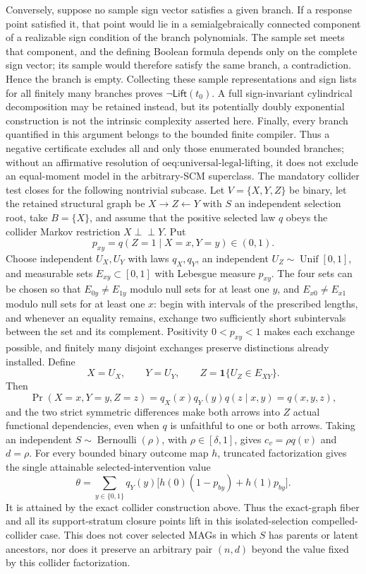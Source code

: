 Conversely, suppose no sample sign vector satisfies a given branch.  If a response point satisfied it, that point would lie in a semialgebraically connected component of a realizable sign condition of the branch polynomials.  The sample set meets that component, and the defining Boolean formula depends only on the complete sign vector; its sample would therefore satisfy the same branch, a contradiction.  Hence the branch is empty.  Collecting these sample representations and sign lists for all finitely many branches proves \(\neg\mathsf{Lift}(t_0)\).  A full sign-invariant cylindrical decomposition may be retained instead, but its potentially doubly exponential construction is not the intrinsic complexity asserted here.  Finally, every branch quantified in this argument belongs to the bounded finite compiler.  Thus a negative certificate excludes all and only those enumerated bounded branches; without an affirmative resolution of \(\text{oeq:universal-legal-lifting}\), it does not exclude an equal-moment model in the arbitrary-SCM superclass.
The mandatory collider test closes for the following nontrivial subcase.  Let \(V=\{X,Y,Z\}\) be binary, let the retained structural graph be \(X\to Z\leftarrow Y\) with \(S\) an independent selection root, take \(B=\{X\}\), and assume that the positive selected law \(q\) obeys the collider Markov restriction \(X\mathbin{\perp\!\!\!\perp}Y\).  Put
\[
p_{xy}=q(Z=1\mid X=x,Y=y)\in(0,1).
\]
Choose independent \(U_X,U_Y\) with laws \(q_X,q_Y\), an independent \(U_Z\sim\operatorname{Unif}[0,1]\), and measurable sets \(E_{xy}\subset[0,1]\) with Lebesgue measure \(p_{xy}\).  The four sets can be chosen so that \(E_{0y}\ne E_{1y}\) modulo null sets for at least one \(y\), and \(E_{x0}\ne E_{x1}\) modulo null sets for at least one \(x\): begin with intervals of the prescribed lengths, and whenever an equality remains, exchange two sufficiently short subintervals between the set and its complement.  Positivity \(0<p_{xy}<1\) makes each exchange possible, and finitely many disjoint exchanges preserve distinctions already installed.  Define
\[
X=U_X,\qquad Y=U_Y,\qquad Z=\mathbf 1\{U_Z\in E_{XY}\}.
\]
Then
\[
\Pr(X=x,Y=y,Z=z)=q_X(x)q_Y(y)q(z\mid x,y)=q(x,y,z),
\]
and the two strict symmetric differences make both arrows into \(Z\) actual functional dependencies, even when \(q\) is unfaithful to one or both arrows.  Taking an independent \(S\sim\operatorname{Bernoulli}(\rho)\), with \(\rho\in[\delta,1]\), gives \(c_v=\rho q(v)\) and \(d=\rho\).  For every bounded binary outcome map \(h\), truncated factorization gives the single attainable selected-intervention value
\[
\theta=
\sum_{y\in\{0,1\}}q_Y(y)
\bigl[h(0)(1-p_{by})+h(1)p_{by}\bigr].
\]
It is attained by the exact collider construction above.  Thus the exact-graph fiber and all its support-stratum closure points lift in this isolated-selection compelled-collider case.  This does not cover selected MAGs in which \(S\) has parents or latent ancestors, nor does it preserve an arbitrary pair \((n,d)\) beyond the value fixed by this collider factorization.
